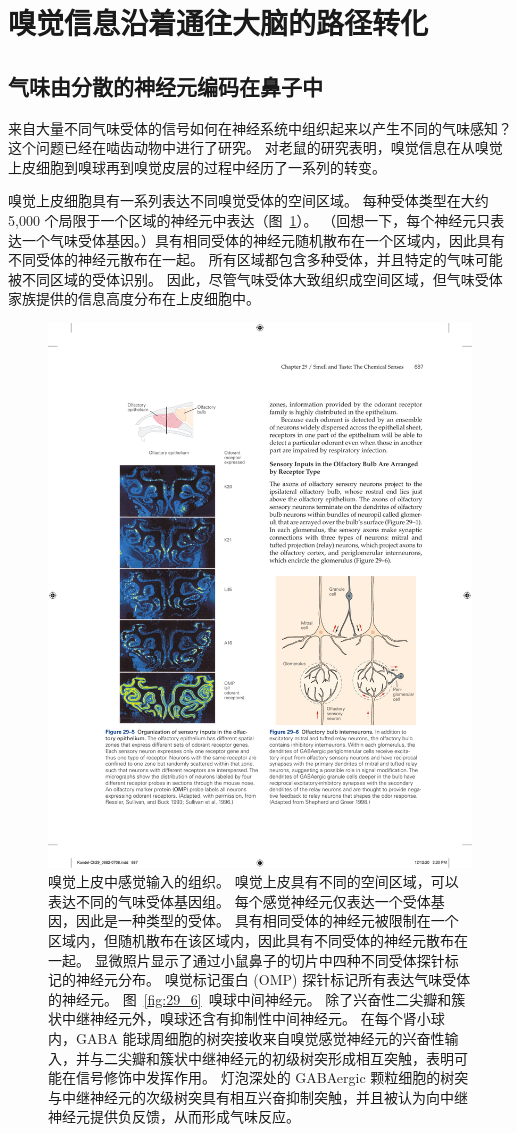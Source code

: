 \section{嗅觉信息沿着通往大脑的路径转化}

\subsection{气味由分散的神经元编码在鼻子中}

来自大量不同气味受体的信号如何在神经系统中组织起来以产生不同的气味感知？
这个问题已经在啮齿动物中进行了研究。
对老鼠的研究表明，嗅觉信息在从嗅觉上皮细胞到嗅球再到嗅觉皮层的过程中经历了一系列的转变。


嗅觉上皮细胞具有一系列表达不同嗅觉受体的空间区域。 
每种受体类型在大约 5,000 个局限于一个区域的神经元中表达（图~\ref{fig:29_5}）。
（回想一下，每个神经元只表达一个气味受体基因。）具有相同受体的神经元随机散布在一个区域内，因此具有不同受体的神经元散布在一起。
所有区域都包含多种受体，并且特定的气味可能被不同区域的受体识别。
因此，尽管气味受体大致组织成空间区域，但气味受体家族提供的信息高度分布在上皮细胞中。


\begin{figure}[htbp]
	\centering
	\includegraphics[width=0.4\linewidth]{chap29/fig_29_5}
	\caption{嗅觉上皮中感觉输入的组织。
		嗅觉上皮具有不同的空间区域，可以表达不同的气味受体基因组。
		每个感觉神经元仅表达一个受体基因，因此是一种类型的受体。
		具有相同受体的神经元被限制在一个区域内，但随机散布在该区域内，因此具有不同受体的神经元散布在一起。
		显微照片显示了通过小鼠鼻子的切片中四种不同受体探针标记的神经元分布。
		嗅觉标记蛋白 (OMP) 探针标记所有表达气味受体的神经元\cite{ressler1993zonal}。
		图~\ref{fig:29_6}~嗅球中间神经元。
		除了兴奋性二尖瓣和簇状中继神经元外，嗅球还含有抑制性中间神经元。
		在每个肾小球内，GABA 能球周细胞的树突接收来自嗅觉感觉神经元的兴奋性输入，并与二尖瓣和簇状中继神经元的初级树突形成相互突触，表明可能在信号修饰中发挥作用。
		灯泡深处的 GABAergic 颗粒细胞的树突与中继神经元的次级树突具有相互兴奋抑制突触，并且被认为向中继神经元提供负反馈，从而形成气味反应\cite{haberly1998synaptic}。}
	\label{fig:29_5}
\end{figure}


